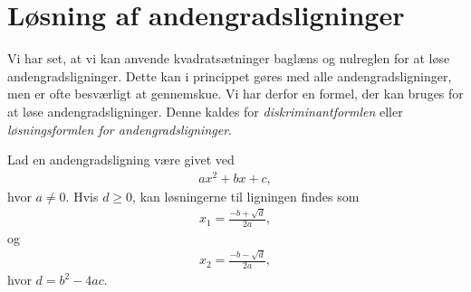 \documentclass[12pt]{article}
\begin{document}
\section*{Løsning af andengradsligninger}
Vi har set, at vi kan anvende kvadratsætninger baglæns og nulreglen for at løse andengradsligninger. Dette kan i princippet gøres med alle andengradsligninger, men er ofte besværligt at gennemskue. Vi har derfor en formel, der kan bruges for at løse andengradsligninger. Denne kaldes for \textit{diskriminantformlen} eller \textit{løsningsformlen for andengradsligninger}.
\begin{setn}[Diskriminantformlen]
	Lad en andengradsligning være givet ved
	\begin{align*}
		ax^2 + bx + c,
	\end{align*}
	hvor $a \neq 0$. Hvis $d \geq 0$, kan løsningerne til ligningen findes som
	\begin{align*}
		x_1 = \frac{-b+ \sqrt{d}}{2a},
	\end{align*}
	og
	\begin{align*}
		x_2 = \frac{-b - \sqrt{d}}{2a},
	\end{align*}
	hvor $d = b^2 - 4ac$. 
\end{setn}
\end{document}
